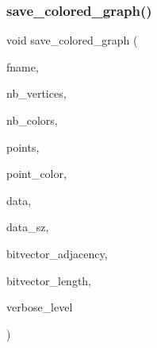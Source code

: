 \subsubsection{\texorpdfstring{save\+\_\+colored\+\_\+graph()}{save\_colored\_graph()}}
{\footnotesize\ttfamily void save\+\_\+colored\+\_\+graph (\begin{DoxyParamCaption}\item[{const \mbox{\hyperlink{galois_8h_ab6cc7b4aeb6ea31aba2b3fbfc83ff5e6}{B\+Y\+TE}} $\ast$}]{fname,  }\item[{\mbox{\hyperlink{galois_8h_a09fddde158a3a20bd2dcadb609de11dc}{I\+NT}}}]{nb\+\_\+vertices,  }\item[{\mbox{\hyperlink{galois_8h_a09fddde158a3a20bd2dcadb609de11dc}{I\+NT}}}]{nb\+\_\+colors,  }\item[{\mbox{\hyperlink{galois_8h_a09fddde158a3a20bd2dcadb609de11dc}{I\+NT}} $\ast$}]{points,  }\item[{\mbox{\hyperlink{galois_8h_a09fddde158a3a20bd2dcadb609de11dc}{I\+NT}} $\ast$}]{point\+\_\+color,  }\item[{\mbox{\hyperlink{galois_8h_a09fddde158a3a20bd2dcadb609de11dc}{I\+NT}} $\ast$}]{data,  }\item[{\mbox{\hyperlink{galois_8h_a09fddde158a3a20bd2dcadb609de11dc}{I\+NT}}}]{data\+\_\+sz,  }\item[{\mbox{\hyperlink{galois_8h_a122c4acf389c050379f00341fdcd5812}{U\+B\+Y\+TE}} $\ast$}]{bitvector\+\_\+adjacency,  }\item[{\mbox{\hyperlink{galois_8h_a09fddde158a3a20bd2dcadb609de11dc}{I\+NT}}}]{bitvector\+\_\+length,  }\item[{\mbox{\hyperlink{galois_8h_a09fddde158a3a20bd2dcadb609de11dc}{I\+NT}}}]{verbose\+\_\+level }\end{DoxyParamCaption})}

\mbox{\label{galois__global_8_c_a5f70384bd08b74ef6f9e0f8663d0f286}} 
